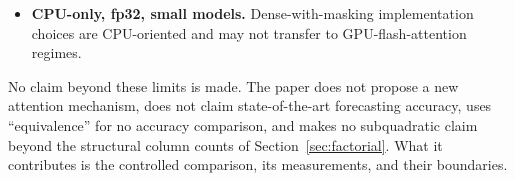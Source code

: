 \begin{itemize}
        forecast cost is reported both ways (full-layer and forecast-required,
        Section~\ref{sec:efficiency}), and a multilayer backbone remains future work.
        A transfer run grafting the four cells onto the published PatchTST backbone
        (ETTh1/ETTh2, five seeds each) finds all four cells tied within noise
        (effects ${\sim}0.003$, an order of magnitude below the minimal backbone).
        That transfer tokenizes the series into 31 patches, so the coarse-router
        cells can select every candidate index token; the tie therefore bounds the
        transfer test from below rather than showing that routing effects vanish on
        stronger backbones (Appendix~\ref{sec:appendix-exploratory}).
  \item \textbf{CPU-only, fp32, small models.} Dense-with-masking
        implementation choices are CPU-oriented and may not transfer to
        GPU-flash-attention regimes.
\end{itemize}

No claim beyond these limits is made. The paper does not propose a new
attention mechanism, does not claim state-of-the-art forecasting accuracy,
uses ``equivalence'' for no accuracy comparison, and makes no subquadratic
claim beyond the structural column counts of Section~\ref{sec:factorial}.
What it contributes is the controlled comparison, its measurements, and their
boundaries.

